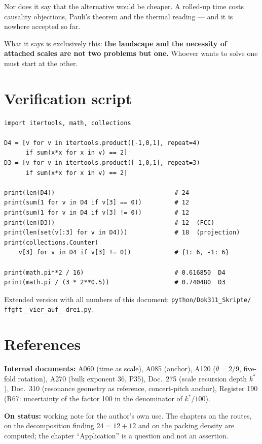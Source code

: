 Nor does it say that the alternative would be cheaper. A rolled-up time
costs causality objections, Pauli's theorem and the thermal reading ---
and it is nowhere accepted so far.

What it says is exclusively this: \textbf{the landscape and the
necessity of attached scales are not two problems but one.} Whoever
wants to solve one must start at the other.

\chapter{Verification script}

\begin{verbatim}
import itertools, math, collections

D4 = [v for v in itertools.product([-1,0,1], repeat=4)
      if sum(x*x for x in v) == 2]
D3 = [v for v in itertools.product([-1,0,1], repeat=3)
      if sum(x*x for x in v) == 2]

print(len(D4))                                 # 24
print(sum(1 for v in D4 if v[3] == 0))         # 12
print(sum(1 for v in D4 if v[3] != 0))         # 12
print(len(D3))                                 # 12  (FCC)
print(len(set(v[:3] for v in D4)))             # 18  (projection)
print(collections.Counter(
    v[3] for v in D4 if v[3] != 0))            # {1: 6, -1: 6}

print(math.pi**2 / 16)                         # 0.616850  D4
print(math.pi / (3 * 2**0.5))                  # 0.740480  D3
\end{verbatim}

Extended version with all numbers of this document:
\texttt{python/\allowbreak Dok311\_\allowbreak Skripte/\allowbreak
ffgft\_\_\allowbreak vier\_\allowbreak auf\_\allowbreak
drei.py}.

\chapter{References}

\textbf{Internal documents:} A060 (time as scale), A085 (anchor), A120
($\theta = 2/9$, five-fold rotation), A270 (bulk exponent 36, P35),
Doc.~275 (scale recursion depth $k^*$), Doc.~310 (resonance geometry as
reference, concert-pitch anchor), Register 190 (R67: uncertainty of the
factor 100 in the denominator of $k^*/100$).

\medskip
\noindent\textbf{On status:} working note for the author's own use. The
chapters on the routes, on the decomposition finding $24 = 12+12$ and
on the packing density are computed; the chapter
\enquote{Application} is a question and not an assertion.


